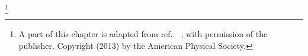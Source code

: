 \footnote[2]{A part of this chapter is adapted from ref.~\cite{bilayer2013}~, with permission of the publisher. Copyright (2013) by the
American Physical Society.}%
